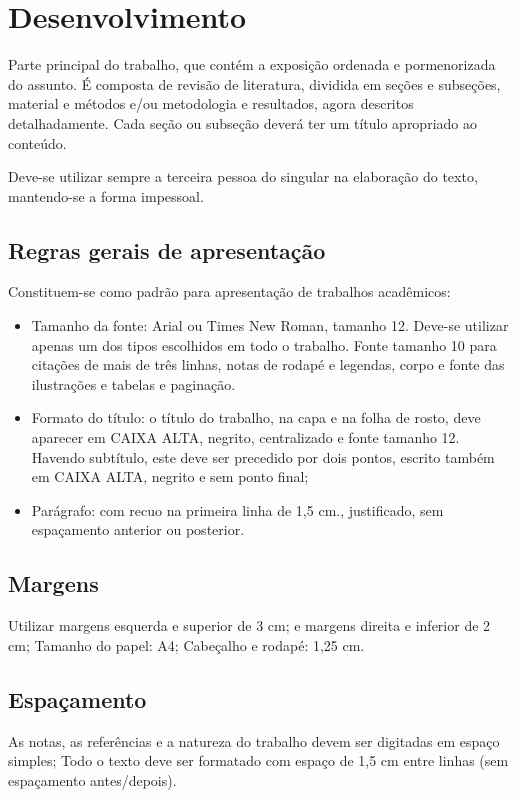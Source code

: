 \chapter{Desenvolvimento}

Parte principal do trabalho, que contém a exposição ordenada e pormenorizada do assunto. É composta de revisão de literatura, dividida em seções e subseções, material e métodos e/ou metodologia e resultados, agora descritos detalhadamente. Cada seção ou subseção deverá ter um título apropriado ao conteúdo.

Deve-se utilizar sempre a terceira pessoa do singular na elaboração do texto, mantendo-se a forma impessoal.

\section{Regras gerais de apresentação}

Constituem-se como padrão para apresentação de trabalhos acadêmicos:

\begin{itemize}
\item Tamanho da fonte: Arial ou Times New Roman, tamanho 12. Deve-se utilizar apenas um dos tipos escolhidos em todo o trabalho. Fonte tamanho 10 para citações de mais de três linhas, notas de rodapé e legendas, corpo e fonte das ilustrações e tabelas e paginação.
\item Formato do título: o título do trabalho, na capa e na folha de rosto, deve aparecer em CAIXA ALTA, negrito, centralizado e fonte tamanho 12. Havendo subtítulo, este deve ser precedido por dois pontos, escrito também em CAIXA ALTA, negrito e sem ponto final;
\item Parágrafo: com recuo na primeira linha de 1,5 cm., justificado, sem espaçamento anterior ou posterior.
\end{itemize}

\section{Margens}
Utilizar margens esquerda e superior de 3 cm; e margens direita e inferior de 2 cm; Tamanho do papel: A4; Cabeçalho e rodapé: 1,25 cm.

\section{Espaçamento}

As notas, as referências e a natureza do trabalho devem ser digitadas em espaço simples; Todo o texto deve ser formatado com espaço de 1,5 cm entre linhas (sem espaçamento antes/depois).

